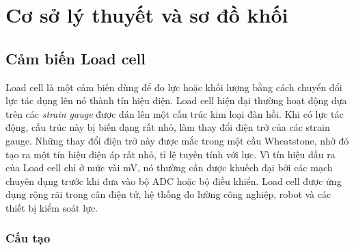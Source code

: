 \chapter{Cơ sở lý thuyết và sơ đồ khối}
\label{chap:c2}

\section{Cảm biến Load cell}
\label{sec:c2:loadcell}

Load cell là một cảm biến dùng để đo lực hoặc khối lượng bằng cách chuyển đổi lực tác dụng lên nó
thành tín hiệu điện. Load cell hiện đại thường hoạt động dựa trên các \textit{strain gauge} được dán
lên một cấu trúc kim loại đàn hồi. Khi có lực tác động, cấu trúc này bị biến dạng rất nhỏ, làm thay
đổi điện trở của các strain gauge. Những thay đổi điện trở này được mắc trong một cầu Wheatstone,
nhờ đó tạo ra một tín hiệu điện áp rất nhỏ, tỉ lệ tuyến tính với lực. Vì tín hiệu đầu ra của Load cell
chỉ ở mức vài \unit{\milli\volt}, nó thường cần được khuếch đại bởi các mạch chuyên dụng trước khi
đưa vào bộ ADC hoặc bộ điều khiển. Load cell được ứng dụng rộng rãi trong cân điện tử, hệ thống đo
lường công nghiệp, robot và các thiết bị kiểm soát lực.

\subsection{Cấu tạo}
\label{sec:c2:loadcell-cau-tao}

